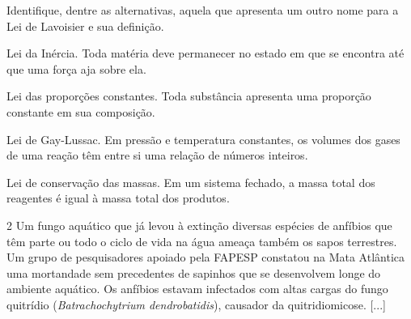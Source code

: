 
Identifique, dentre as alternativas, aquela que apresenta um outro nome para a Lei de Lavoisier e sua definição.

\begin{escolha}
\item
  Lei da Inércia. Toda matéria deve permanecer no estado em que se
  encontra até que uma força aja sobre ela.
\item
  Lei das proporções constantes. Toda substância apresenta uma proporção
  constante em sua composição.
\item
  Lei de Gay-Lussac. Em pressão e temperatura constantes, os volumes dos
  gases de uma reação têm entre si uma relação de números inteiros.
\item
  Lei de conservação das massas. Em um sistema fechado, a massa total dos
  reagentes é igual à massa total dos produtos.
\end{escolha}


\num{2}
  Um fungo aquático que já levou à extinção diversas espécies de
  anfíbios que têm parte ou todo o ciclo de vida na água ameaça também
  os sapos terrestres. Um grupo de pesquisadores apoiado pela FAPESP
  constatou na Mata Atlântica uma mortandade sem precedentes de sapinhos
  que se desenvolvem longe do ambiente aquático. Os anfíbios estavam
  infectados com altas cargas do fungo quitrídio (\emph{Batrachochytrium
  dendrobatidis}), causador da quitridiomicose. [...]


